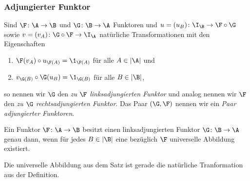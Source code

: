 \documentclass[serif,9pt]{beamer}
\begin{document}
\begin{frame}
  \frametitle{Adjungierter Funktor}

\pause
  \begin{defn*}
  Sind $\F \colon \A \to \B$ und $\G \colon \B \to \A$ Funktoren und $u = (u_B) \colon \I_\B \to \F \circ \G$ sowie $v = (v_A) \colon \G \circ \F \to \I_\A$ natürliche Transformationen mit den Eigenschaften
  \begin{enumerate}[(1)]
    \item $\F(v_A) \circ u_{\F(A)} = \1_{\F(A)}$ für alle $A \in |\A|$ und
    \item $v_{\G(B)} \circ \G(u_B) = \1_{\G(B)}$ für alle $B \in |\B|$,
  \end{enumerate}
  so nennen wir $\G$ den \emph{zu $\F$ linksadjungierten Funktor} und analog nennen wir $\F$ den \emph{zu $\G$ rechtsadjungierten Funktor}.
  Das Paar $(\G, \F)$ nennen wir ein \emph{Paar adjungierter Funktoren}.
\end{defn*}

\pause

  \begin{thm*}
    Ein Funktor $\F \colon \A \to \B$ besitzt einen linksadjungierten Funktor $\G \colon \B \to \A$ genau dann, wenn für jedes $B \in |\B|$ eine bezüglich $\F$ universelle Abbildung existiert.
  \end{thm*}

\pause

  \begin{bem}
    Die universelle Abbildung aus dem Satz ist gerade die natürliche Tranformation aus der Definition.
  \end{bem}
\end{frame}
\end{document}
